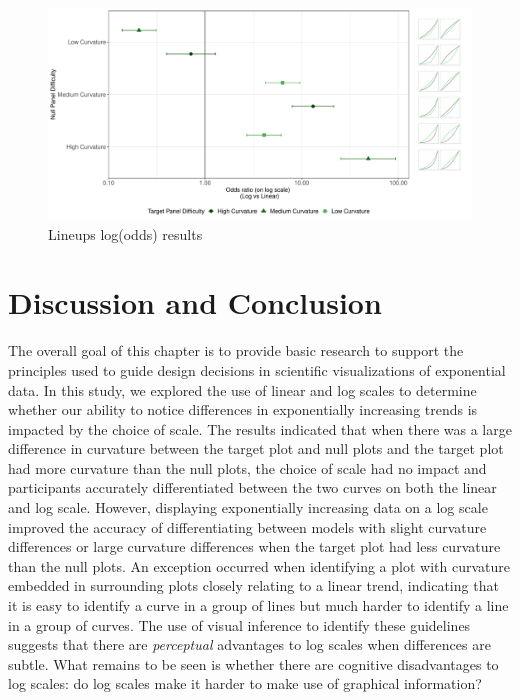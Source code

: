 \documentclass[print]{nuthesis}
\begin{document}
\begin{figure}[tbp]

{\centering \includegraphics[width=\linewidth,]{thesis_files/figure-latex/odds-ratio-plot-1} 

}

\caption{Lineups log(odds) results}\label{fig:odds-ratio-plot}
\end{figure}

\hypertarget{discussion-and-conclusion}{%
\section{Discussion and Conclusion}\label{discussion-and-conclusion}}

The overall goal of this chapter is to provide basic research to support the principles used to guide design decisions in scientific visualizations of exponential data.
In this study, we explored the use of linear and log scales to determine whether our ability to notice differences in exponentially increasing trends is impacted by the choice of scale.
The results indicated that when there was a large difference in curvature between the target plot and null plots and the target plot had more curvature than the null plots, the choice of scale had no impact and participants accurately differentiated between the two curves on both the linear and log scale.
However, displaying exponentially increasing data on a log scale improved the accuracy of differentiating between models with slight curvature differences or large curvature differences when the target plot had less curvature than the null plots.
An exception occurred when identifying a plot with curvature embedded in surrounding plots closely relating to a linear trend, indicating that it is easy to identify a curve in a group of lines but much harder to identify a line in a group of curves.
The use of visual inference to identify these guidelines suggests that there are \emph{perceptual} advantages to log scales when differences are subtle.
What remains to be seen is whether there are cognitive disadvantages to log scales: do log scales make it harder to make use of graphical information?
\end{document}
